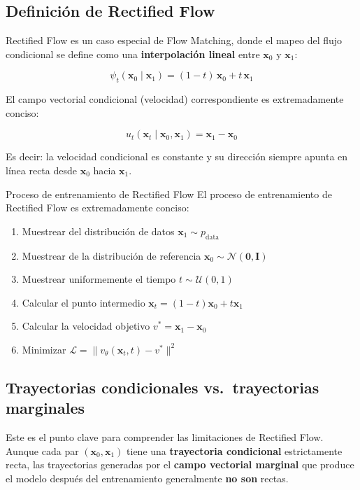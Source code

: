 \documentclass[a4paper]{article}
\begin{document}
\subsection{Definición de Rectified Flow}

Rectified Flow es un caso especial de Flow Matching, donde el mapeo del flujo condicional se define como una \textbf{interpolación lineal} entre $\mathbf{x}_0$ y $\mathbf{x}_1$:

$$\psi_t(\mathbf{x}_0 \mid \mathbf{x}_1) = (1 - t)\, \mathbf{x}_0 + t\, \mathbf{x}_1$$

El campo vectorial condicional (velocidad) correspondiente es extremadamente conciso:

$$u_t(\mathbf{x}_t \mid \mathbf{x}_0, \mathbf{x}_1) = \mathbf{x}_1 - \mathbf{x}_0$$

Es decir: la velocidad condicional es constante y su dirección siempre apunta en línea recta desde $\mathbf{x}_0$ hacia $\mathbf{x}_1$.

\begin{importantbox}{Proceso de entrenamiento de Rectified Flow}
El proceso de entrenamiento de Rectified Flow es extremadamente conciso:
\begin{enumerate}
    \item Muestrear del distribución de datos $\mathbf{x}_1 \sim p_{\text{data}}$
    \item Muestrear de la distribución de referencia $\mathbf{x}_0 \sim \mathcal{N}(\mathbf{0}, \mathbf{I})$
    \item Muestrear uniformemente el tiempo $t \sim \mathcal{U}(0, 1)$
    \item Calcular el punto intermedio $\mathbf{x}_t = (1-t)\mathbf{x}_0 + t\mathbf{x}_1$
    \item Calcular la velocidad objetivo $v^* = \mathbf{x}_1 - \mathbf{x}_0$
    \item Minimizar $\mathcal{L} = \| v_\theta(\mathbf{x}_t, t) - v^* \|^2$
\end{enumerate}
\end{importantbox}

\subsection{Trayectorias condicionales vs.\ trayectorias marginales}

Este es el punto clave para comprender las limitaciones de Rectified Flow. Aunque cada par $(\mathbf{x}_0, \mathbf{x}_1)$ tiene una \textbf{trayectoria condicional} estrictamente recta, las trayectorias generadas por el \textbf{campo vectorial marginal} que produce el modelo después del entrenamiento generalmente \textbf{no son} rectas.
\end{document}
